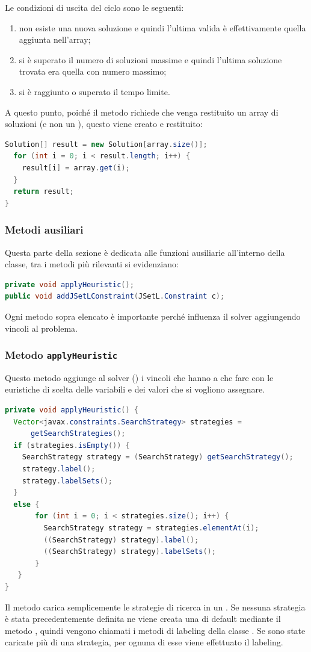 Le condizioni di uscita del ciclo sono le seguenti:
\begin{enumerate}
\item non esiste una nuova soluzione e quindi l'ultima valida è effettivamente
quella aggiunta nell'array;
\item si è superato il numero di soluzioni massime e quindi l'ultima soluzione
trovata era quella con numero massimo;
\item si è raggiunto o superato il tempo limite.
\end{enumerate}

A questo punto, poiché il metodo richiede che venga restituito un array di 
soluzioni (e non un ), questo viene creato e restituito:
\begin{lstlisting}[language = Java,
                   caption = {\files{findAllSolutions}, calcolo del risultato.}
                  ]
  Solution[] result = new Solution[array.size()];
  for (int i = 0; i < result.length; i++) {
    result[i] = array.get(i);
  }
  return result;
}
\end{lstlisting}

\subsubsection{Metodi ausiliari}
Questa parte della sezione è dedicata alle funzioni ausiliarie all'interno
della classe, tra i metodi più rilevanti si evidenziano:
\begin{lstlisting}[language = Java, frame = single]
private void applyHeuristic();
public void addJSetLConstraint(JSetL.Constraint c);
\end{lstlisting}
Ogni metodo sopra elencato è importante perché influenza il solver aggiungendo
vincoli al problema.

\subsubsection{Metodo \texttt{applyHeuristic}}
Questo metodo aggiunge al solver () i vincoli che hanno a che
fare con le euristiche di scelta delle variabili e dei valori che si vogliono
assegnare.
\begin{lstlisting}[language = Java,
                   caption = {\files{applyHeuristic}.}
                  ]
private void applyHeuristic() {
  Vector<javax.constraints.SearchStrategy> strategies = 
      getSearchStrategies();
  if (strategies.isEmpty()) {
    SearchStrategy strategy = (SearchStrategy) getSearchStrategy();
    strategy.label();
    strategy.labelSets();
  }
  else {
       for (int i = 0; i < strategies.size(); i++) {
         SearchStrategy strategy = strategies.elementAt(i);
         ((SearchStrategy) strategy).label();
         ((SearchStrategy) strategy).labelSets();
       }
   }
}
\end{lstlisting}
Il metodo  carica semplicemente le strategie di ricerca in un 
. Se nessuna strategia è stata precedentemente definita ne
viene creata una di default mediante il metodo , quindi
vengono chiamati i metodi di labeling della classe .
Se sono state caricate più di una strategia, per ognuna di esse viene 
effettuato il labeling.

